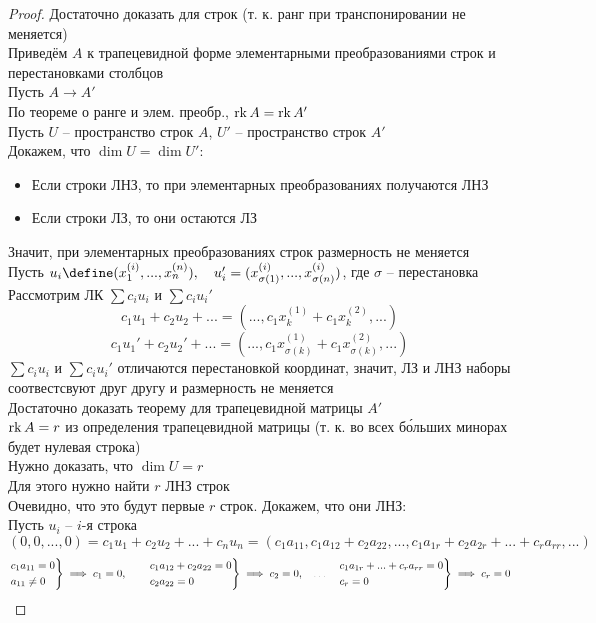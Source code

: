 \begin{proof}
	Достаточно доказать для строк (т. к. ранг при транспонировании не меняется) \\
	Приведём $ A $ к трапецевидной форме элементарными преобразованиями строк и перестановками столбцов \\
	Пусть $ A \to A' $ \\
	По теореме о ранге и элем. преобр., $ \operatorname{rk} A = \operatorname{rk} A' $ \\
	Пусть $ U $ -- пространство строк $ A $, $ U' $ -- пространство строк $ A' $ \\
	Докажем, что $ \dim U = \dim U' $:
	\begin{itemize}
		\item Если строки ЛНЗ, то при элементарных преобразованиях получаются ЛНЗ
		\item Если строки ЛЗ, то они остаются ЛЗ
	\end{itemize}
	Значит, при элементарных преобразованиях строк размерность не меняется \\
	Пусть $ u_i \define (x_1^{(i)}, ..., x_n^{(n)}), \quad u_i' = (x_{\sigma(1)}^{(i)}, ..., x_{\sigma(n)}^{(i)}) $, где $ \sigma $ -- перестановка \\
	Рассмотрим ЛК $ \sum c_iu_i $ и $ \sum c_iu_i' $
	$$ c_1u_1 + c_2u_2 + ... = (..., c_1x_k^{(1)} + c_1x_k^{(2)}, ...) $$
	$$ c_1u_1' + c_2u_2' + ... = (..., c_1x_{\sigma(k)}^{(1)} + c_1x_{\sigma(k)}^{(2)}, ...) $$
	$ \sum c_iu_i $ и $ \sum c_iu_i' $ отличаются перестановкой координат, значит, ЛЗ и ЛНЗ наборы соотвестсвуют друг другу и размерность не меняется \\
	Достаточно доказать теорему для трапецевидной матрицы $ A' $ \\
	$ \operatorname{rk} A = r $ из определения трапецевидной матрицы (т. к. во всех б\'{о}льших минорах будет нулевая строка) \\
	Нужно доказать, что $ \dim U = r $ \\
	Для этого нужно найти $ r $ ЛНЗ строк \\
	Очевидно, что это будут первые $ r $ строк. Докажем, что они ЛНЗ: \\
	Пусть $ u_i $ -- $ i $-я строка
	$$ (0, 0, ..., 0) = c_1u_1 + c_2u_2 + ... + c_nu_n = (c_1a_{11}, c_1a_{12} + c_2a_{22}, ..., c_1a_{1r} + c_2a_{2r} + ... + c_ra_{rr}, ...) $$
	$$
	\begin{rcases}
		c_1a_{11} = 0 \\
		a_{11} \ne 0
	\end{rcases} \implies c_1 = 0, \qquad
	\begin{rcases}
		c_1a_{12} + c_2a_{22} = 0 \\
		c_2a_{22} = 0
	\end{rcases} \implies c_2 = 0, \quad \widedots[1em] \quad
	\begin{rcases}
		c_1a_{1r} + ... + c_ra_{rr} = 0 \\
		c_r = 0
	\end{rcases} \implies c_r = 0 $$
\end{proof}

